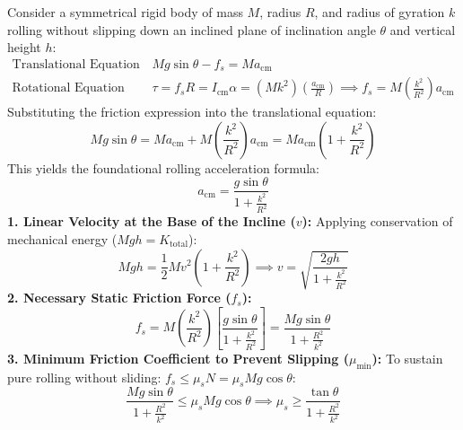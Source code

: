 \documentclass[10pt,a4paper]{article}
\begin{document}
\begin{formulabox}
Consider a symmetrical rigid body of mass $M$, radius $R$, and radius of gyration $k$ rolling without slipping down an inclined plane of inclination angle $\theta$ and vertical height $h$:
\begin{align}
  \text{Translational Equation of Motion along Incline: } &Mg\sin\theta - f_s = M a_{\text{cm}} \\
  \text{Rotational Equation about Centre of Mass: } &\tau = f_s R = I_{\text{cm}}\alpha = (M k^2)\left(\frac{a_{\text{cm}}}{R}\right) \implies f_s = M\left(\frac{k^2}{R^2}\right)a_{\text{cm}}
\end{align}
Substituting the friction expression into the translational equation:
\begin{equation}
  Mg\sin\theta = M a_{\text{cm}} + M\left(\frac{k^2}{R^2}\right)a_{\text{cm}} = M a_{\text{cm}}\left(1 + \frac{k^2}{R^2}\right)
\end{equation}
This yields the foundational rolling acceleration formula:
\begin{equation}
  a_{\text{cm}} = \frac{g\sin\theta}{1 + \frac{k^2}{R^2}}
\end{equation}
\textbf{1. Linear Velocity at the Base of the Incline ($v$):} Applying conservation of mechanical energy ($Mgh = K_{\text{total}}$):
\begin{equation}
  Mgh = \frac{1}{2}M v^2\left(1 + \frac{k^2}{R^2}\right) \implies v = \sqrt{\frac{2gh}{1 + \frac{k^2}{R^2}}}
\end{equation}
\textbf{2. Necessary Static Friction Force ($f_s$):}
\begin{equation}
  f_s = M\left(\frac{k^2}{R^2}\right)\left[\frac{g\sin\theta}{1 + \frac{k^2}{R^2}}\right] = \frac{Mg\sin\theta}{1 + \frac{R^2}{k^2}}
\end{equation}
\textbf{3. Minimum Friction Coefficient to Prevent Slipping ($\mu_{\min}$):}
To sustain pure rolling without sliding: $f_s \le \mu_s N = \mu_s Mg\cos\theta$:
\begin{equation}
  \frac{Mg\sin\theta}{1 + \frac{R^2}{k^2}} \le \mu_s Mg\cos\theta \implies \mu_s \ge \frac{\tan\theta}{1 + \frac{R^2}{k^2}}
\end{equation}
\end{formulabox}
\end{document}
